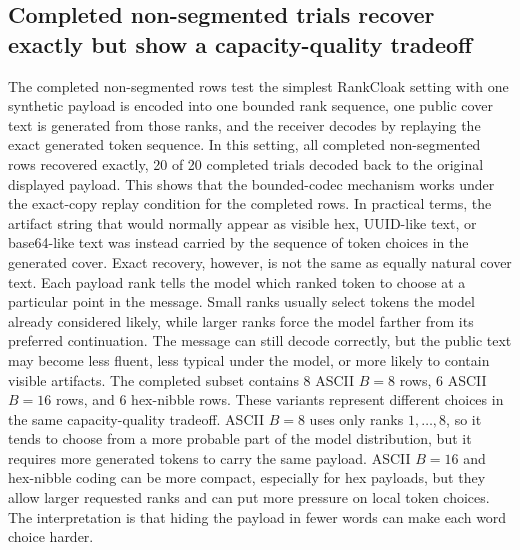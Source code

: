\documentclass[fleqn,10pt]{wlscirep}
\begin{document}
\subsection*{Completed non-segmented trials recover exactly but show a capacity-quality tradeoff}

The completed non-segmented rows test the simplest RankCloak setting with one synthetic payload is encoded into one bounded rank sequence, one public cover text is generated from those ranks, and the receiver decodes by replaying the exact generated token sequence. In this setting, all completed non-segmented rows recovered exactly, 20 of 20 completed trials decoded back to the original displayed payload. This shows that the bounded-codec mechanism works under the exact-copy replay condition for the completed rows. In practical terms, the artifact string that would normally appear as visible hex, UUID-like text, or base64-like text was instead carried by the sequence of token choices in the generated cover.
Exact recovery, however, is not the same as equally natural cover text. Each payload rank tells the model which ranked token to choose at a particular point in the message. Small ranks usually select tokens the model already considered likely, while larger ranks force the model farther from its preferred continuation. The message can still decode correctly, but the public text may become less fluent, less typical under the model, or more likely to contain visible artifacts.
The completed subset contains 8 ASCII \(B=8\) rows, 6 ASCII \(B=16\) rows, and 6 hex-nibble rows. These variants represent different choices in the same capacity-quality tradeoff. ASCII \(B=8\) uses only ranks \(1,\ldots,8\), so it tends to choose from a more probable part of the model distribution, but it requires more generated tokens to carry the same payload. ASCII \(B=16\) and hex-nibble coding can be more compact, especially for hex payloads, but they allow larger requested ranks and can put more pressure on local token choices. The interpretation is that hiding the payload in fewer words can make each word choice harder.
\end{document}
